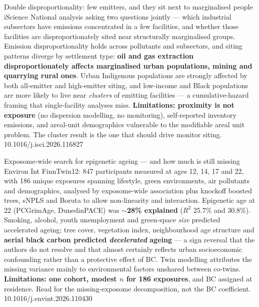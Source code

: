 \documentclass[10pt]{article}
\begin{document}
{Double disproportionality: few emitters, and they sit next to marginalised people}
{iScience}
{National analysis asking two questions jointly --- which industrial subsectors have
emissions concentrated in a few facilities, and whether those facilities are
disproportionately sited near structurally marginalised groups. Emission
disproportionality holds across pollutants and subsectors, and siting patterns diverge by
settlement type: \textbf{oil and gas extraction disproportionately affects marginalised
urban populations, mining and quarrying rural ones}. Urban Indigenous populations are
strongly affected by both all-emitter and high-emitter siting, and low-income and Black
populations are more likely to live near \emph{clusters} of emitting facilities --- a
cumulative-hazard framing that single-facility analyses miss. \textbf{Limitations:
proximity is not exposure} (no dispersion modelling, no monitoring), self-reported
inventory emissions, and areal-unit demographics vulnerable to the modifiable areal unit
problem. The cluster result is the one that should drive monitor siting.}
{10.1016/j.isci.2026.116827}


{Exposome-wide search for epigenetic ageing --- and how much is still missing}
{Environ Int}
{FinnTwin12: 847 participants measured at ages 12, 14, 17 and 22, with 186 unique
exposures spanning lifestyle, green environments, air pollutants and demographics,
analysed by exposome-wide association plus knockoff boosted trees, sNPLS and Boruta to
allow non-linearity and interaction. Epigenetic age at 22 (PCGrimAge, DunedinPACE) was
\textbf{$\sim$28\% explained} ($R^2$ 25.7\% and 30.8\%). Smoking, alcohol, youth
unemployment and green-space \emph{size} predicted accelerated ageing; tree cover,
vegetation index, neighbourhood age structure and \textbf{aerial black carbon predicted
\emph{decelerated} ageing} --- a sign reversal that the authors do not resolve and that
almost certainly reflects urban socioeconomic confounding rather than a protective effect
of BC. Twin modelling attributes the missing variance mainly to environmental factors
unshared between co-twins. \textbf{Limitations: one cohort, modest $n$ for 186 exposures},
and BC assigned at residence. Read for the missing-exposome decomposition, not the BC
coefficient.}
{10.1016/j.envint.2026.110430}
\end{document}
